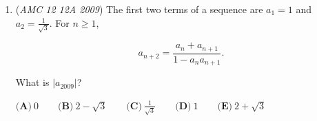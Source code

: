 \begin{enumerate}
 
$\log_2{(T(2008)+T(2007))} \approx \log_2{T(2008)}$

 
From here on out, it's calm waters. To recap,

 
$\log_2{(\log_2{(\log_2{(B)})})} \approx T(2008)$

 
Taking the $\log$ $2007$ more times(for a total of $2010$), we get

 
$\log_2\log_2... T(2008) = T(1) = 2$

 
Taking the log again, we get

 
$\log_2{2} = 1$

 
(Now we're at $2011$ times)

 
Once more and we have

 
$\log_2{1} = 0$.

 
($2012$ times)

 
But wait, there's more! (IYKYK lol) Remember how we ignored the $\varepsilon$? Well, It's time to bring it back. Every time we took the log, we would get $T(\text{something})$ + $\varepsilon$ because we defined $\varepsilon$ to be some very, very small (but finite) number. Let's go back a few steps:

 
$\log_2{2} = 1$

 
should really be

 
$\log_2{(2+\varepsilon)} = 1+\epsilon$

 
and

 
$\log_2{1} = 0$

 
should really be

 
$\log_2{(1+\varepsilon)} = \varepsilon$

 
Since $\varepsilon$ is still a positive number, we can take the $\log$ of it one last time before it becomes negative. So, after a long and very tiring journey (for both you, the reader, and me, the writer) we have $k$ (the number of times we took the $\log$) $= 2013 \Rightarrow \boxed{\text{E}}$.~TheAsian

 


	\item (\textit{AMC 12 12A 2009}) The first two terms of a sequence are $a_1 = 1$ and $a_2 = \frac {1}{\sqrt3}$. For $n\ge1$,


 
 \[a_{n + 2} = \frac {a_n + a_{n + 1}}{1 - a_na_{n + 1}}.\]

 What is $|a_{2009}|$?


 $\textbf{(A)}\ 0\qquad \textbf{(B)}\ 2 - \sqrt3\qquad \textbf{(C)}\ \frac {1}{\sqrt3}\qquad \textbf{(D)}\ 1\qquad \textbf{(E)}\ 2 + \sqrt3$


\end{enumerate}

